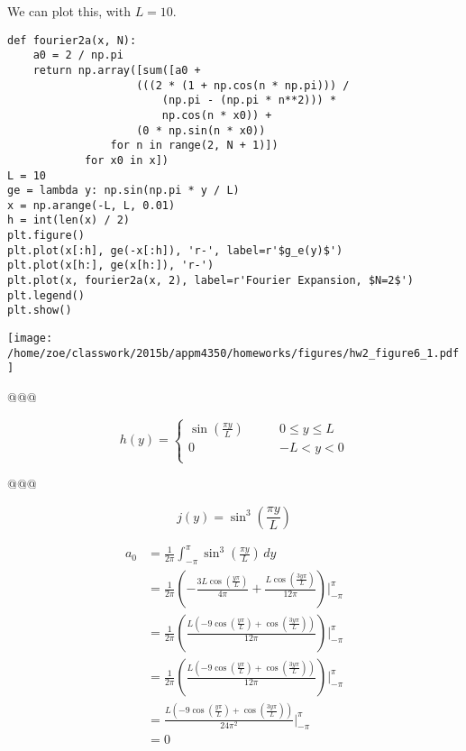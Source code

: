 \documentclass[10pt]{article}
\begin{document}
\begin{easylist}[enumerate]
    We can plot this, with $L = 10$.

\weave

\begin{verbatim}
def fourier2a(x, N):
    a0 = 2 / np.pi
    return np.array([sum([a0 +
                    (((2 * (1 + np.cos(n * np.pi))) /
                        (np.pi - (np.pi * n**2))) *
                        np.cos(n * x0)) +
                    (0 * np.sin(n * x0))
                for n in range(2, N + 1)])
            for x0 in x])
L = 10
ge = lambda y: np.sin(np.pi * y / L)
x = np.arange(-L, L, 0.01)
h = int(len(x) / 2)
plt.figure()
plt.plot(x[:h], ge(-x[:h]), 'r-', label=r'$g_e(y)$')
plt.plot(x[h:], ge(x[h:]), 'r-')
plt.plot(x, fourier2a(x, 2), label=r'Fourier Expansion, $N=2$')
plt.legend()
plt.show()
\end{verbatim}
\texttt{[image: /home/zoe/classwork/2015b/appm4350/homeworks/figures/hw2\_figure6\_1.pdf]}

\noweave

    @@@

    \[
        h (y)=
            \begin{cases}
                \sin \left( \frac{\pi y}{L} \right) \qquad & 0 \le y \le L\\
                0 \qquad & -L < y < 0\\
            \end{cases}
    \]

    @@@

    \[
        j(y) = \sin^3 \left( \frac{\pi y}{L} \right)
    \]

    \begin{align*}
        a_0 &= \frac{1}{2\pi} \int_{-\pi}^\pi \sin^3 \left( \frac{\pi y}{L} \right) \, dy\\
        &= \frac{1}{2\pi} \left( - \frac{3 L \cos\left(\frac{y\pi}{L}\right)}{4\pi} + \frac{L \cos\left(\frac{3y\pi}{L}\right)}{12\pi} \right) \bigg|_{-\pi}^\pi\\
        &= \frac{1}{2\pi} \left( \frac{L \left( -9 \cos\left(\frac{y\pi}{L}\right) + \cos\left(\frac{3y\pi}{L}\right)\right)}{12 \pi} \right) \bigg|_{-\pi}^\pi\\
        &= \frac{1}{2\pi} \left( \frac{L \left( -9 \cos\left(\frac{y\pi}{L}\right) + \cos\left(\frac{3y\pi}{L}\right)\right)}{12 \pi} \right) \bigg|_{-\pi}^\pi\\
        &= \frac{L \left( -9 \cos\left(\frac{y\pi}{L}\right) + \cos\left(\frac{3y\pi}{L}\right)\right)}{24 \pi^2} \bigg|_{-\pi}^\pi\\
        &= 0
    \end{align*}


\end{easylist}
\end{document}
